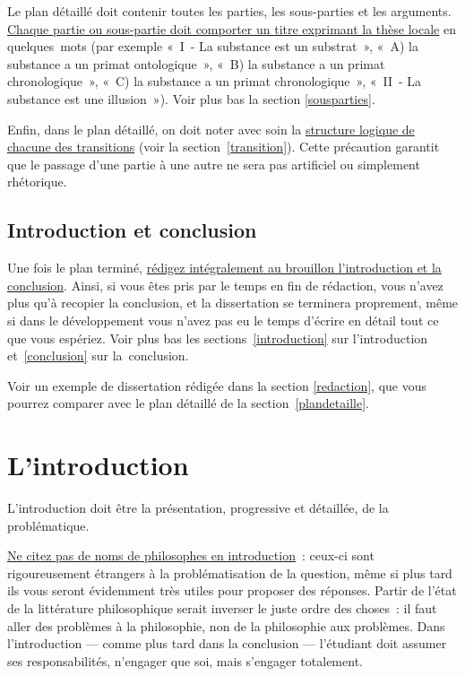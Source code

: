 \documentclass[a4paper,12pt]{article}
\begin{document}
Le plan détaillé doit contenir toutes les parties, les sous-parties et
les arguments. \uline{Chaque partie ou sous-partie doit comporter un titre
exprimant la thèse locale} en quelques mots (par exemple « I - La
substance est un substrat », « A) la substance a un primat
ontologique », « B) la substance a un primat chronologique », « C) la
substance a un primat chronologique », « II - La substance est une
illusion »). Voir plus bas la section \ref{sousparties}.

Enfin, dans le plan détaillé, on doit noter avec soin la \uline{structure
logique de chacune des transitions} (voir la section \ref{transition}). Cette
précaution garantit que le passage d'une partie à une autre ne sera pas
artificiel ou simplement rhétorique.

\subsection{Introduction et conclusion}
\label{sec-1-4}

Une fois le plan terminé, \uline{rédigez intégralement au brouillon
l'introduction et la conclusion}. Ainsi, si vous êtes pris par le temps
en fin de rédaction, vous n'avez plus qu'à recopier la conclusion, et la
dissertation se terminera proprement, même si dans le développement vous
n'avez pas eu le temps d'écrire en détail tout ce que vous espériez.
Voir plus bas les sections \ref{introduction} sur l'introduction et \ref{conclusion}
sur la conclusion.

Voir un exemple de dissertation rédigée dans la section \ref{redaction}, que
vous pourrez comparer avec le plan détaillé de la section \ref{plandetaille}.

\section{L'introduction}
\label{sec-2}
\label{introduction}

L'introduction doit être la présentation, progressive et détaillée, de
la problématique.

\uline{Ne citez pas de noms de philosophes en introduction} : ceux-ci sont
rigoureusement étrangers à la problématisation de la question, même si
plus tard ils vous seront évidemment très utiles pour proposer des
réponses. Partir de l'état de la littérature philosophique serait
inverser le juste ordre des choses : il faut aller des problèmes à la
philosophie, non de la philosophie aux problèmes. Dans l'introduction
--- comme plus tard dans la conclusion --- l'étudiant doit assumer ses
responsabilités, n'engager que soi, mais s'engager totalement. 
\end{document}
